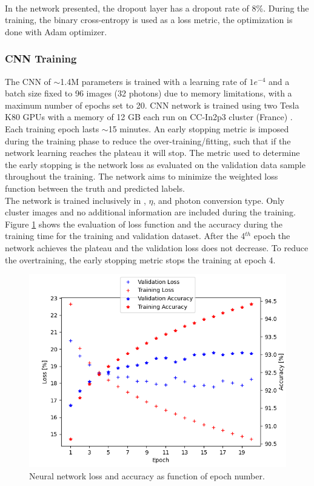 \\
In the network presented, the dropout layer has a dropout rate of 8\%.
During the training, the binary cross-entropy is used as a loss metric, the optimization is done with Adam optimizer.

\subsubsection{CNN Training}
\label{gamma:CNN:Training}
The CNN of $\sim$1.4M parameters is trained with a learning rate of $1e^{-4}$ and a batch size fixed to 96 images (32 photons) due to memory limitations, with a maximum number of epochs set to 20. CNN network is trained using two Tesla K80 GPUs with a memory of 12 GB each run on CC-In2p3 cluster (France) \cite{cca}. Each training epoch lasts $\sim$15 minutes. An early stopping metric \cite{early} is imposed during the training phase to reduce the over-training/fitting, such that if the network learning reaches the plateau it will stop. The metric used to determine the early stopping is the network loss as evaluated on the validation data sample throughout the training. The network aims to minimize the weighted loss function between the truth and predicted labels.\\
The network is trained inclusively in \eT, $\eta$, and photon conversion type. Only cluster images and no additional information are included during the training.
Figure \ref{fig:gamma:CNN:Training:loss} shows the evaluation of loss function and the accuracy during the training time for the training and validation dataset. After the 4$^{th}$ epoch the network achieves the plateau and the validation loss does not decrease. To reduce the overtraining, the early stopping metric stops the training at epoch 4.
\begin{figure}[htbp]
    \centering
    \includegraphics[width=.6\textwidth]{Ch3/Img/CNN_Loss_Accuracy.png}
    \begin{tcolorbox}[colback=black!5!white,colframe=white!75!black]
    \caption{Neural network loss and accuracy as function of epoch number.}
    \label{fig:gamma:CNN:Training:loss}
    \end{tcolorbox}
    
\end{figure}

